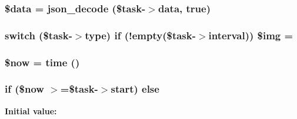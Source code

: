 \subsubsection[{\$data}]{\setlength{\rightskip}{0pt plus 5cm}\$data = json\+\_\+decode (\$task-\/$>$data, true)}\label{staff_2systemtask_2index_8blade_8php_a6efc15b5a2314dd4b5aaa556a375c6d6}
\hypertarget{staff_2systemtask_2index_8blade_8php_a423dd871164e8731d1420cb5456fab6f}{}
\subsubsection[{\$img}]{\setlength{\rightskip}{0pt plus 5cm}switch (\$task-\/$>$type) if (!empty(\$task-\/$>$interval)) \$img = \textquotesingle{}\textquotesingle{}}\label{staff_2systemtask_2index_8blade_8php_a423dd871164e8731d1420cb5456fab6f}
\hypertarget{staff_2systemtask_2index_8blade_8php_af1d5ccdee975b8f4d20aaffc5b28557c}{}
\subsubsection[{\$now}]{\setlength{\rightskip}{0pt plus 5cm}\$now = time ()}\label{staff_2systemtask_2index_8blade_8php_af1d5ccdee975b8f4d20aaffc5b28557c}
\hypertarget{staff_2systemtask_2index_8blade_8php_aff58cfff2c93dbf4380c4f920afa1596}{}
\subsubsection[{else}]{\setlength{\rightskip}{0pt plus 5cm}if (\$now $>$=\$task-\/$>$start) else}\label{staff_2systemtask_2index_8blade_8php_aff58cfff2c93dbf4380c4f920afa1596}
{\bfseries Initial value\+:}
